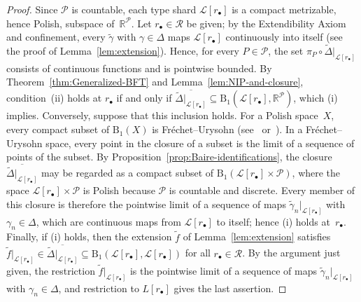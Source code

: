 \documentclass[psamsfonts]{amsart}
\theoremstyle{definition}
\theoremstyle{remark}
\numberwithin{equation}{section}
\begin{document}
\begin{proof}
  Since $\mathcal{P}$ is countable, each type shard $\mathcal{L}[r_\bullet]$ is a compact metrizable, hence Polish, subspace of~$\mathbb{R}^\mathcal{P}$.
  Let $r_\bullet\in \mathscr{R}$ be given;
  by the Extendibility Axiom and confinement, every $\tilde\gamma$ with $\gamma\in\Delta$ maps $\mathcal{L}[r_\bullet]$ continuously into itself (see the proof of Lemma~\ref{lem:extension}).
  Hence, for every $P\in\mathcal{P}$, the set $\pi_P\circ \tilde\Delta|_{\mathcal{L}[r_\bullet]}$ consists of continuous functions and is pointwise bounded.
  By Theorem~\ref{thm:Generalized-BFT} and Lemma~\ref{lem:NIP-and-closure}, condition~(ii) holds at $r_\bullet$ if and only if $\overline{\tilde\Delta|_{\mathcal{L}[r_\bullet]}}\subseteq\mathrm{B}_1(\mathcal{L}[r_\bullet],\mathbb{R}^{\mathcal{P}})$, which (i) implies.
  Conversely, suppose that this inclusion holds.
  For a Polish space~$X$, every compact subset of $\mathrm{B}_1(X)$ is Fréchet--Urysohn
  (see~\cite[Theorem~3F]{BFT_1978_PCompactBaire} or~\cite[Theorem~4.1]{debs2013rosenthal}).
  In a Fréchet--Urysohn space, every point in the closure of a subset is the limit of a sequence of points of the subset.
  By Proposition~\ref{prop:Baire-identifications}, the closure $\overline{\tilde\Delta|_{\mathcal{L}[r_\bullet]}}$ may be regarded as a compact subset of $\mathrm{B}_1(\mathcal{L}[r_\bullet]\times\mathcal{P})$, where the space $\mathcal{L}[r_\bullet]\times\mathcal{P}$ is Polish because $\mathcal{P}$ is countable and discrete.
  Every member of this closure is therefore the pointwise limit of a sequence of maps $\tilde\gamma_n|_{\mathcal{L}[r_\bullet]}$ with $\gamma_n\in\Delta$, which are continuous maps from $\mathcal{L}[r_\bullet]$ to itself;
  hence (i) holds at~$r_\bullet$.
  Finally, if (i) holds, then the extension $\tilde f$ of Lemma~\ref{lem:extension} satisfies
  $\tilde f|_{\mathcal{L}[r_\bullet]}\in\overline{\tilde\Delta|_{\mathcal{L}[r_\bullet]}}\subseteq \mathrm{B}_1(\mathcal{L}[r_\bullet],\mathcal{L}[r_\bullet])$ for all $r_\bullet\in \mathscr{R}$.
  By the argument just given, the restriction $\tilde f|_{\mathcal{L}[r_\bullet]}$ is the pointwise limit of a sequence of maps $\tilde\gamma_n|_{\mathcal{L}[r_\bullet]}$ with $\gamma_n\in\Delta$, and restriction to $L[r_\bullet]$ gives the last assertion.
\end{proof}
\end{document}
